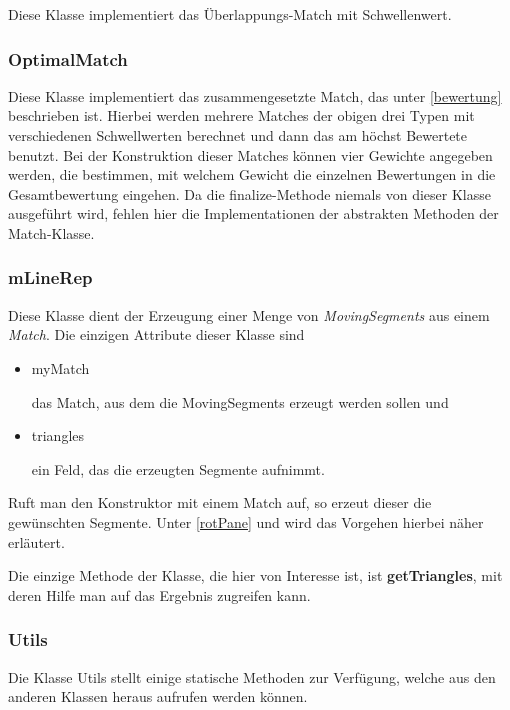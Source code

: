 Diese Klasse implementiert das Überlappungs-Match mit Schwellenwert.

\subsubsection{OptimalMatch}

Diese Klasse implementiert das zusammengesetzte Match, das unter \vref{bewertung} beschrieben ist. Hierbei werden mehrere Matches der obigen drei Typen mit verschiedenen Schwellwerten berechnet und dann das am höchst Bewertete benutzt. Bei der Konstruktion dieser Matches können vier Gewichte angegeben werden, die bestimmen, mit welchem Gewicht die einzelnen Bewertungen in die Gesamtbewertung eingehen. Da die finalize-Methode niemals von dieser Klasse ausgeführt wird, fehlen hier die Implementationen der abstrakten Methoden der Match-Klasse.

\subsubsection{mLineRep}

Diese Klasse dient der Erzeugung einer Menge von \textit{MovingSegments} aus einem \textit{Match}. Die einzigen Attribute dieser Klasse sind
\begin{itemize}

\item  myMatch

das Match, aus dem die MovingSegments erzeugt werden sollen und

\item triangles

ein Feld, das die erzeugten Segmente aufnimmt.

\end{itemize}

Ruft man den Konstruktor mit einem Match auf, so erzeut dieser die gewünschten Segmente. Unter \vref{rotPane} und  wird das Vorgehen hierbei näher erläutert.

Die einzige Methode der Klasse, die hier von Interesse ist, ist \textbf{getTriangles}, mit deren Hilfe man auf das Ergebnis zugreifen kann.

\subsubsection{Utils}

Die Klasse Utils stellt einige statische Methoden zur Verfügung, welche aus den anderen Klassen heraus aufrufen werden können.

